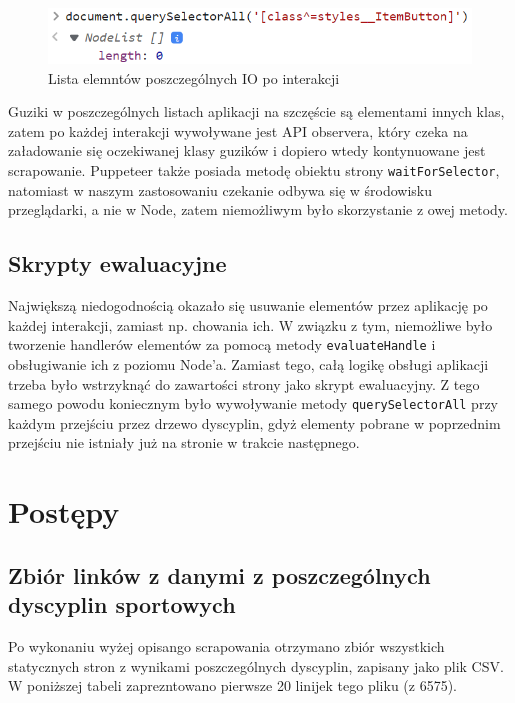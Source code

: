 \documentclass[a4paper,11pt]{article}
\begin{document}
\begin{figure}[h!t]
    \centering
    \includegraphics[width=0.5\linewidth]{selector-on-sports-list.png}
    \caption{Lista elemntów poszczególnych IO po interakcji}
\end{figure}

Guziki w poszczególnych listach aplikacji na szczęście są elementami innych klas,
zatem po każdej interakcji wywoływane jest API observera, który czeka na załadowanie
się oczekiwanej klasy guzików i dopiero wtedy kontynuowane jest scrapowanie.
Puppeteer także posiada metodę obiektu strony \verb|waitForSelector|, natomiast 
w naszym zastosowaniu czekanie odbywa się w środowisku przeglądarki, a nie w Node,
zatem niemożliwym było skorzystanie z owej metody.

\subsection{Skrypty ewaluacyjne}
Największą niedogodnością okazało się usuwanie elementów przez aplikację po każdej
interakcji, zamiast np. chowania ich. W związku z tym, niemożliwe było tworzenie
handlerów elementów za pomocą metody \verb|evaluateHandle| i obsługiwanie ich z
poziomu Node'a. Zamiast tego, całą logikę obsługi aplikacji trzeba było wstrzyknąć 
do zawartości strony jako skrypt ewaluacyjny. Z tego samego powodu koniecznym było
wywoływanie metody \verb|querySelectorAll| przy każdym przejściu przez drzewo dyscyplin,
gdyż elementy pobrane w poprzednim przejściu nie istniały już na stronie w trakcie
następnego.

\section{Postępy}
\subsection{Zbiór linków z danymi z poszczególnych dyscyplin sportowych}
Po wykonaniu wyżej opisango scrapowania otrzymano zbiór wszystkich statycznych
stron z wynikami poszczególnych dyscyplin, zapisany jako plik CSV. W poniższej 
tabeli zaprezntowano pierwsze 20 linijek tego pliku (z 6575).
\begin{center}
\end{center}
\end{document}
